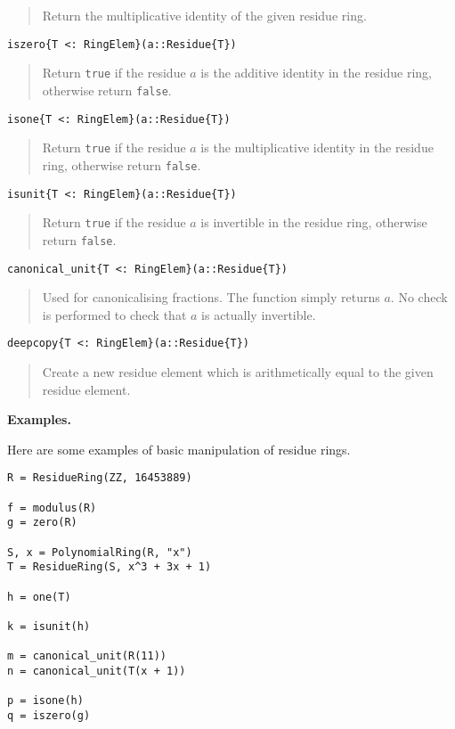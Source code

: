 \documentclass[a4paper,10pt]{article}
\newcommand{\code}{\lstinline}
\newcommand{\desc}[1]{\vspace{-3mm}\begin{quote}#1\end{quote}}
\begin{document}
\desc{Return the multiplicative identity of the given residue ring.}

\begin{lstlisting}
iszero{T <: RingElem}(a::Residue{T})
\end{lstlisting}

\desc{Return \code{true} if the residue $a$ is the additive identity in the
residue ring, otherwise return \code{false}.}

\begin{lstlisting}
isone{T <: RingElem}(a::Residue{T})
\end{lstlisting}

\desc{Return \code{true} if the residue $a$ is the multiplicative identity in
the residue ring, otherwise return \code{false}.}

\begin{lstlisting}
isunit{T <: RingElem}(a::Residue{T})
\end{lstlisting}

\desc{Return \code{true} if the residue $a$ is invertible in the residue ring,
otherwise return \code{false}.}

\begin{lstlisting}
canonical_unit{T <: RingElem}(a::Residue{T})
\end{lstlisting}

\desc{Used for canonicalising fractions. The function simply returns $a$. No
check is performed to check that $a$ is actually invertible.}

\begin{lstlisting}
deepcopy{T <: RingElem}(a::Residue{T})
\end{lstlisting}

\desc{Create a new residue element which is arithmetically equal to the given
residue element.}

\textbf{Examples.}

Here are some examples of basic manipulation of residue rings.

\begin{lstlisting}
R = ResidueRing(ZZ, 16453889)

f = modulus(R)
g = zero(R)

S, x = PolynomialRing(R, "x")
T = ResidueRing(S, x^3 + 3x + 1)

h = one(T)

k = isunit(h)

m = canonical_unit(R(11))
n = canonical_unit(T(x + 1))

p = isone(h)
q = iszero(g)
\end{lstlisting}
\end{document}
